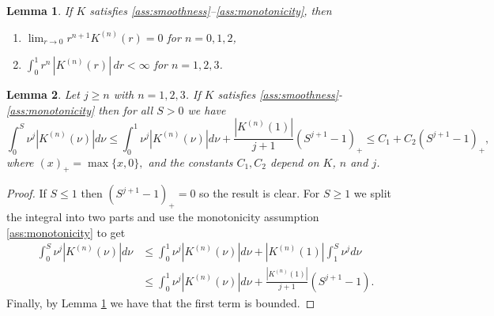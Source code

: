 \documentclass[10pt,a4paper]{amsart}
\newtheorem{lemma}{Lemma}
\begin{document}
\begin{lemma} \label{lemma:intDerivades}
    If $K$ satisfies \ref{ass:smoothness}--\ref{ass:monotonicity}, then
    \begin{enumerate}
        \item $\displaystyle \lim_{r\to 0} r^{n+1}K^{(n)}(r)=0$ for $n=0,1,2$, \label{prop:Limits0}
        \item $\displaystyle \int_0^1 r^n\,|K^{(n)}(r)|\,dr < \infty$ for $n=1,2,3$. \label{prop:integrabilitatrK}
    \end{enumerate}
\end{lemma}

\begin{lemma} \label{lemma:canviVar}
     Let $j\geq n$ with $n=1,2,3$. If $K$ satisfies \ref{ass:smoothness}-\ref{ass:monotonicity} then for all $S>0$ we have 
     \begin{equation*}
         \int_0^S \nu^j |K^{(n)}(\nu)|d\nu \leq \int_0^1 \nu^j |K^{(n)}(\nu)| d\nu + \frac{|K^{(n)}(1)|}{j+1}(S^{j+1}-1)_+ \leq C_1 + C_2(S^{j+1}-1)_+,
     \end{equation*}
     where $(x)_+=\max\{x,0\},$ and the constants $C_1, C_2$ depend on $K$, $n$ and $j$.
\end{lemma}

\begin{proof}
    If $S\leq 1$ then $(S^{j+1}-1)_+=0$ so the result is clear. For $S\geq 1$ we split the integral into two parts and use the monotonicity assumption \ref{ass:monotonicity} to get
    \begin{align*}
        \int_0^S \nu^j |K^{(n)}(\nu)|d\nu &\leq \int_0^1 \nu^j |K^{(n)}(\nu)| d\nu + |K^{(n)}(1)| \int_1^S \nu^j  d\nu \\
        & \leq \int_0^1 \nu^j |K^{(n)}(\nu)| d\nu + \frac{|K^{(n)}(1)|}{j+1}(S^{j+1}-1).
    \end{align*}
    Finally, by Lemma \ref{lemma:intDerivades} we have that the first term is bounded.
\end{proof}
\end{document}
